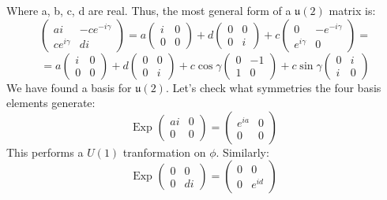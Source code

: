 \documentclass[12 pt]{article}
\begin{document}
Where a, b, c, d are real. Thus, the most general form of a $\mathfrak{u}(2)$ matrix is:
\[          \left( \begin{array} {cc}  a i & -c e^{-i \gamma} \\  c e^{i\gamma} & d i  \end{array}   \right)  =  a \left( \begin{array} {cc}  i & 0 \\ 0 & 0  \end{array}   \right)   +   d \left( \begin{array} {cc}  0 & 0 \\ 0 & i  \end{array}   \right)   + c  \left( \begin{array} {cc}  0 & - e^{-i \gamma} \\  e^{i\gamma} & 0  \end{array}   \right)    =     \]
\[  =       a \left( \begin{array} {cc}  i & 0 \\ 0 & 0  \end{array}   \right)   +   d \left( \begin{array} {cc}  0 & 0 \\ 0 & i  \end{array}   \right)   + c \cos \gamma  \left( \begin{array} {cc}  0 & - 1 \\  1 & 0  \end{array}   \right)   + c \sin \gamma \left( \begin{array} {cc}  0 & i \\  i & 0  \end{array}   \right)  \]
We have found a basis for $\mathfrak{u}(2)$. Let's check what symmetries the four basis elements generate:
\[     \text{Exp }  \left( \begin{array} {cc}  ai & 0 \\ 0 & 0  \end{array}   \right) =   \left( \begin{array} {cc}  e^{ia} & 0 \\ 0 & 0  \end{array}   \right)   \]
This performs a $U(1)$ tranformation on $\phi$. Similarly:
\[     \text{Exp }  \left( \begin{array} {cc}  0 & 0 \\ 0 & di  \end{array}   \right) =   \left( \begin{array} {cc}  0 & 0 \\ 0 & e^{id}  \end{array}   \right)   \]
\end{document}
